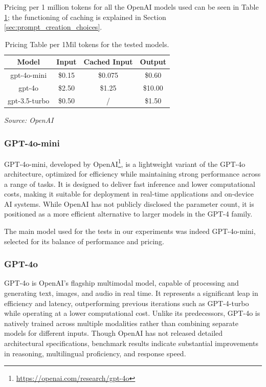 Pricing per 1 million tokens for all the OpenAI models used can be seen in Table
\ref{tab:pricing}; the functioning of caching is explained in Section \ref{sec:prompt_creation_choices}.

\vspace{3mm}
\begin{table}[h]
  \centering
  \renewcommand{\arraystretch}{1.5}
  \setlength{\tabcolsep}{8pt}
  \begin{tabular}{ c c c c }
    \textbf{Model} & \textbf{Input} & \textbf{Cached Input} & \textbf{Output} \\
    \hline
    gpt-4o-mini    & \$0.15         & \$0.075               & \$0.60          \\
    gpt-4o         & \$2.50         & \$1.25                & \$10.00         \\
    gpt-3.5-turbo  & \$0.50         & /                     & \$1.50          \\
  \end{tabular}
  \caption{Pricing Table per 1Mil tokens for the tested models.}
  {\emph{Source: OpenAI \footnotemark}} \label{tab:pricing}
\end{table}
\vspace{3mm}

\subsubsection{GPT-4o-mini}
GPT-4o-mini, developed by OpenAI\footnote{\url{https://openai.com/research/gpt-4o}},
is a lightweight variant of the GPT-4o architecture, optimized for efficiency
while maintaining strong performance across a range of tasks. It is designed to deliver
fast inference and lower computational costs, making it suitable for deployment
in real-time applications and on-device AI systems. While OpenAI has not publicly
disclosed the parameter count, it is positioned as a more efficient alternative
to larger models in the GPT-4 family.

The main model used for the tests in our experiments was indeed GPT-4o-mini, selected
for its balance of performance and pricing.

\subsubsection{GPT-4o}
GPT-4o is OpenAI's flagship multimodal model, capable of processing and
generating text, images, and audio in real time. It represents a significant leap
in efficiency and latency, outperforming previous iterations such as GPT-4-turbo
while operating at a lower computational cost. Unlike its predecessors, GPT-4o
is natively trained across multiple modalities rather than combining separate
models for different inputs. Though OpenAI has not released detailed architectural
specifications, benchmark results indicate substantial improvements in reasoning,
multilingual proficiency, and response speed.

